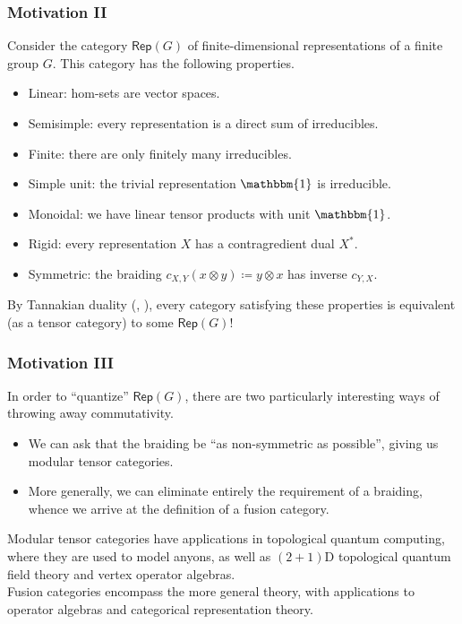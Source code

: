 \documentclass{beamer}
\newcommand{\textcat}[1]{\mathrm{\textsf{#1}}}
\begin{document}
\begin{frame}
\frametitle{Motivation II}
Consider the category $\textcat{Rep}(G)$ of finite-dimensional representations of a finite group $G$. This category has the following properties.\pause\\[1.5ex]
\begin{itemize}[<+->]
\item \textcolor{structure}{Linear}: hom-sets are vector spaces.
\item \textcolor{structure}{Semisimple}: every representation is a direct sum of irreducibles.
\item \textcolor{structure}{Finite}: there are only finitely many irreducibles.
\item \textcolor{structure}{Simple unit}: the trivial representation $\mathbbm{1}$ is irreducible.
\item \textcolor{structure}{Monoidal}: we have linear tensor products with unit $\mathbbm{1}$.
\item \textcolor{structure}{Rigid}: every representation $X$ has a contragredient dual $X^*$.
\item \textcolor{structure}{Symmetric}: the braiding $c_{X,Y}(x \otimes y) \coloneqq y \otimes x$ has inverse $c_{Y,X}$.\\[2ex]
\end{itemize}\pause[\thebeamerpauses]
By Tannakian duality (\cite{Del90}, \cite{Del02}), every category satisfying these properties is equivalent (as a tensor category) to some $\textcat{Rep}(G)$!
\end{frame}

\begin{frame}
\frametitle{Motivation III}
In order to ``quantize'' $\textcat{Rep}(G)$, there are two particularly interesting ways of throwing away commutativity.\pause\\[1.5ex]
\begin{itemize}[<+->]
\item We can ask that the braiding be ``as non-symmetric as possible'', giving us \textcolor{structure}{modular tensor categories}.\\[2ex]
\item More generally, we can eliminate entirely the requirement of a braiding, whence we arrive at the definition of a \textcolor{structure}{fusion category}.\\[2ex]
\end{itemize}\pause[\thebeamerpauses]
Modular tensor categories have applications in topological quantum computing, where they are used to model anyons, as well as $(2+1)$D topological quantum field theory and vertex operator algebras.\pause\\[2ex]

Fusion categories encompass the more general theory, with applications to operator algebras and categorical representation theory.
\end{frame}
\end{document}
